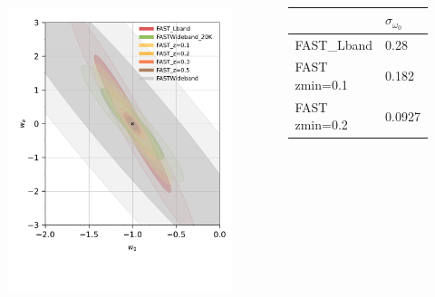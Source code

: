 \documentclass[UTF8]{beamer}
\begin{document}
    \begin{frame}
        \frametitle{}
        \begin{columns}[c]
            \begin{figure}
                \centering
                \includegraphics[scale=0.3]{test-w0wa_withwideband.pdf}
            \end{figure}
            \begin{table}[]
                \begin{tabular}{l|ll}
                \hline
                                     & $\sigma_{\omega_0}$ & $\sigma_{\omega_a}$ \\ \hline
                FAST\_Lband          & 0.28                & 1.33                \\
                FAST zmin=0.1        & 0.182               & 0.7314              \\
                FAST zmin=0.2        & 0.0927              & 0.3047              \\

\end{tabular}
\end{table}
\end{columns}
\end{frame}
\end{document}
